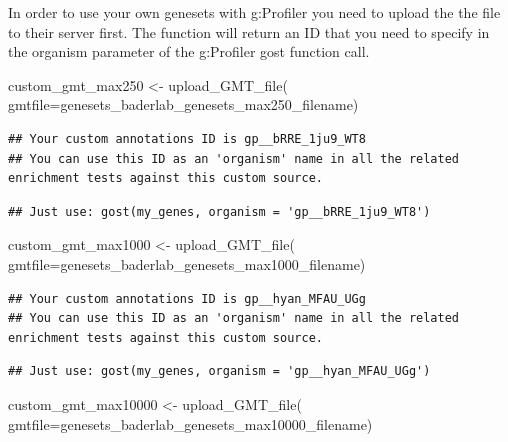 \documentclass[
]{book}
\newenvironment{Shaded}{\begin{snugshade}}{\end{snugshade}}
\newcommand{\AttributeTok}[1]{\textcolor[rgb]{0.77,0.63,0.00}{#1}}
\newcommand{\FunctionTok}[1]{\textcolor[rgb]{0.00,0.00,0.00}{#1}}
\newcommand{\NormalTok}[1]{#1}
\newcommand{\OtherTok}[1]{\textcolor[rgb]{0.56,0.35,0.01}{#1}}
\begin{document}
In order to use your own genesets with g:Profiler you need to upload the the file to their server first. The function will return an ID that you need to specify in the organism parameter of the g:Profiler gost function call.

\begin{Shaded}
\begin{Highlighting}[]
\NormalTok{custom\_gmt\_max250 }\OtherTok{\textless{}{-}} \FunctionTok{upload\_GMT\_file}\NormalTok{(}
                        \AttributeTok{gmtfile=}\NormalTok{genesets\_baderlab\_genesets\_max250\_filename)}
\end{Highlighting}
\end{Shaded}

\begin{verbatim}
## Your custom annotations ID is gp__bRRE_1ju9_WT8
## You can use this ID as an 'organism' name in all the related enrichment tests against this custom source.
\end{verbatim}

\begin{verbatim}
## Just use: gost(my_genes, organism = 'gp__bRRE_1ju9_WT8')
\end{verbatim}

\begin{Shaded}
\begin{Highlighting}[]
\NormalTok{custom\_gmt\_max1000 }\OtherTok{\textless{}{-}} \FunctionTok{upload\_GMT\_file}\NormalTok{(}
                        \AttributeTok{gmtfile=}\NormalTok{genesets\_baderlab\_genesets\_max1000\_filename)}
\end{Highlighting}
\end{Shaded}

\begin{verbatim}
## Your custom annotations ID is gp__hyan_MFAU_UGg
## You can use this ID as an 'organism' name in all the related enrichment tests against this custom source.
\end{verbatim}

\begin{verbatim}
## Just use: gost(my_genes, organism = 'gp__hyan_MFAU_UGg')
\end{verbatim}

\begin{Shaded}
\begin{Highlighting}[]
\NormalTok{custom\_gmt\_max10000 }\OtherTok{\textless{}{-}} \FunctionTok{upload\_GMT\_file}\NormalTok{(}
                        \AttributeTok{gmtfile=}\NormalTok{genesets\_baderlab\_genesets\_max10000\_filename)}
\end{Highlighting}
\end{Shaded}
\end{document}
